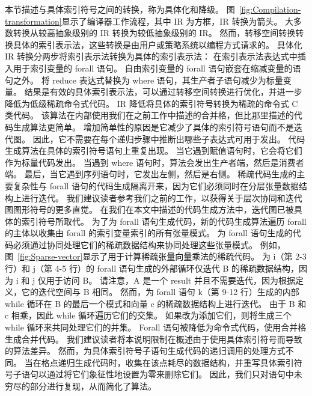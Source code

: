 \begin{translation}
本节描述与具体索引符号之间的转换，称为具体化和降级。 图~\ref{fig:Compilation-transformation}显示了编译器工作流程，其中 IR 为方框，IR 转换为箭头。
大多数转换从较高抽象级别的 IR 转换为较低抽象级别的 IR。 然而，转移空间转换转换具体的索引表示法，这些转换是由用户或策略系统以编程方式请求的。 
具体化 IR 转换分两步将索引表示法转换为具体的索引表示法： 在索引表示法表达式中插入用于索引变量的 forall 语句。 
自由索引变量的 forall 语句嵌套在缩减变量的语句之外。 将 reduce 表达式替换为 where 语句，其生产者子语句减少为标量变量。 
结果是有效的具体索引表示法，可以通过转移空间转换进行优化，并进一步降低为低级稀疏命令式代码。 IR 降低将具体的索引符号转换为稀疏的命令式 C 类代码。 
该算法在内部使用我们在之前工作中描述的合并格，但比那里描述的代码生成算法更简单。 增加简单性的原因是它减少了具体的索引符号语句而不是迭代图。 
因此，它不需要在每个递归步骤中推断出哪些子表达式可用于发出。 代码生成算法在具体的索引符号语句上重复出现。 
当它遇到赋值语句时，它会将它们作为标量代码发出。 当遇到 where 语句时，算法会发出生产者端，然后是消费者端。 
最后，当它遇到序列语句时，它发出左侧，然后是右侧。 稀疏代码生成的主要复杂性与 forall 语句的代码生成隔离开来，因为它们必须同时在分层张量数据结构上进行迭代。 
我们建议读者参考我们之前的工作，以获得关于层次协同和迭代图图形符号的更多直觉。 在我们在本文中描述的代码生成方法中，迭代图已被具体的索引符号所取代。 
为了为 forall 语句生成代码，新的代码生成算法遍历 forall 的主体以收集由 forall 的索引变量索引的所有张量模式。 
为 forall 语句生成的代码必须通过协同处理它们的稀疏数据结构来协同处理这些张量模式。 例如，图~\ref{fig:Sparse-vector}显示了用于计算稀疏张量向量乘法的稀疏代码。 
为 i（第 2-3 行）和 j（第 4-5 行）的 forall 语句生成的外部循环仅迭代 B 的稀疏数据结构，因为 i 和 j 仅用于访问 B。
请注意，A 是一个 result 并且不需要迭代，因为根据定义，它的迭代空间与 B 相同。 
然而，为 forall 语句 k（第 9-12 行）生成的内部 while 循环在 B 的最后一个模式和向量 c 的稀疏数据结构上进行迭代。 
由于 B 和 c 相乘，因此 while 循环遍历它们的交集。 如果改为添加它们，则将生成三个 while 循环来共同处理它们的并集。
Forall 语句被降低为命令式代码，使用合并格生成合并代码。 我们建议读者将本说明限制在概述由于使用具体索引符号而导致的算法差异。 
然而，为具体索引符号子语句生成代码的递归调用的处理方式不同。 当在格点递归生成代码时，收集在该点耗尽的数据结构，并重写具体索引符号子语句以通过将它们象征性地设置为零来删除它们。 
因此，我们只对语句中未穷尽的部分进行复现，从而简化了算法。


\end{translation}
